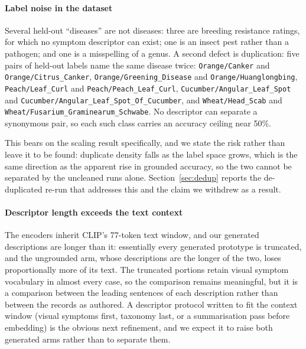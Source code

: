 \documentclass[a4paper,fleqn]{cas-dc}
\begin{document}
\paragraph{Label noise in the dataset} Several held-out ``diseases'' are not diseases: three are
breeding resistance ratings, for which no symptom descriptor can exist; one is an insect pest rather
than a pathogen; and one is a misspelling of a genus. A second defect is duplication: five pairs of
held-out labels name the same disease twice: \texttt{Orange/Canker} and
\texttt{Orange/Citrus\_Canker}, \texttt{Orange/Greening\_Disease} and
\texttt{Orange/Huanglongbing}, \texttt{Peach/Leaf\_Curl} and \texttt{Peach/Peach\_Leaf\_Curl},
\texttt{Cucumber/Angular\_Leaf\_Spot} and \texttt{Cucumber/Angular\_Leaf\_Spot\_Of\_Cucumber}, and
\texttt{Wheat/Head\_Scab} and \texttt{Wheat/Fusarium\_Graminearum\_Schwabe}. No descriptor can
separate a synonymous pair, so each such class carries an accuracy ceiling near 50\%.

This bears on the scaling result specifically, and we state the risk rather than leave it to be
found: duplicate density falls as the label space grows, which is the same direction as the
apparent rise in grounded accuracy, so the two cannot be separated by the uncleaned runs alone.
Section~\ref{sec:dedup} reports the de-duplicated re-run that addresses this and the claim we
withdrew as a result.

\paragraph{Descriptor length exceeds the text context} The encoders inherit CLIP's 77-token text
window, and our generated descriptions are longer than it: essentially every generated prototype is
truncated, and the ungrounded arm, whose descriptions are the longer of the two, loses proportionally
more of its text. The truncated portions retain visual symptom vocabulary in almost every case, so
the comparison remains meaningful, but it is a comparison between the leading sentences of each
description rather than between the records as authored. A descriptor protocol written to fit the
context window (visual symptoms first, taxonomy last, or a summarisation pass before embedding)
is the obvious next refinement, and we expect it to raise both generated arms rather than to
separate them.
\end{document}
